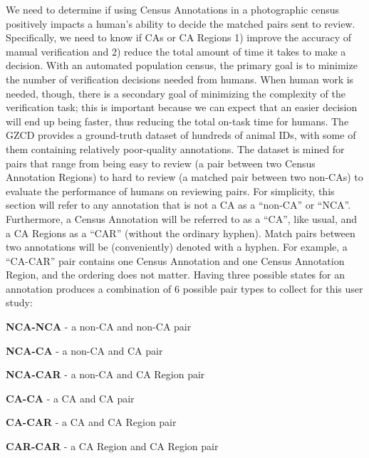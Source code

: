 We need to determine if using Census Annotations in a photographic census positively impacts a human's ability to decide the matched pairs sent to review.  Specifically, we need to know if CAs or CA Regions 1) improve the accuracy of manual verification and 2) reduce the total amount of time it takes to make a decision.  With an automated population census, the primary goal is to minimize the number of verification decisions needed from humans.  When human work is needed, though, there is a secondary goal of minimizing the complexity of the verification task; this is important because we can expect that an easier decision will end up being faster, thus reducing the total on-task time for humans.  The GZCD provides a ground-truth dataset of hundreds of animal IDs, with some of them containing relatively poor-quality annotations.  The dataset is mined for pairs that range from being easy to review (a pair between two Census Annotation Regions) to hard to review (a matched pair between two non-CAs) to evaluate the performance of humans on reviewing pairs.  For simplicity, this section will refer to any annotation that is not a CA as a ``non-CA''  or ``NCA''.  Furthermore, a Census Annotation will be referred to as a ``CA'', like usual, and a CA Regions as a ``CAR'' (without the ordinary hyphen).  Match pairs between two annotations will be (conveniently) denoted with a hyphen.  For example, a ``CA-CAR'' pair contains one Census Annotation and one Census Annotation Region, and the ordering does not matter.  Having three possible states for an annotation produces a combination of 6 possible pair types to collect for this user study:

\squishlist
\item \textbf{NCA-NCA} - a non-CA and non-CA pair
\item \textbf{NCA-CA} - a non-CA and CA pair
\item \textbf{NCA-CAR} - a non-CA and CA Region pair
\item \textbf{CA-CA} - a CA and CA pair
\item \textbf{CA-CAR} - a CA and CA Region pair
\item \textbf{CAR-CAR} - a CA Region and CA Region pair
\squishend

